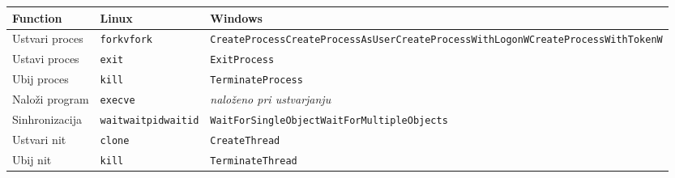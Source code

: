 \documentclass[a4paper,12pt,openright]{book}
\begin{document}
\begin{table}[h!]
	\begin{center}
		\begin{tabular}{ p{3.7cm}|p{2.5cm}|p{6cm} }
			Function          & Linux                                                  & Windows                                                                                                                                                                         \\
			\hline
			Ustvari proces    & \verb|fork|\newline\verb|vfork|                        & \verb|CreateProcess|\newline\verb|CreateProcessAsUser|\newline\verb|CreateProcessWithLogonW|\newline\verb|CreateProcessWithTokenW|                                              \\
			Ustavi proces     & \verb|exit|                                            & \verb|ExitProcess|                                                                                                                                                              \\
			Ubij proces       & \verb|kill|                                            & \verb|TerminateProcess|                                                                                                                                                         \\
			Naloži program   & \verb|execve|                                          & \textit{naloženo pri ustvarjanju}                                                                                                                                              \\
			Sinhronizacija    & \verb|wait|\newline\verb|waitpid|\newline\verb|waitid| & \verb|WaitForSingleObject|\newline\verb|WaitForMultipleObjects|                                                                                                                 \\
			Ustvari nit       & \verb|clone|                                           & \verb|CreateThread|                                                                                                                                                             \\
			Ubij nit          & \verb|kill|                                            & \verb|TerminateThread|                                                                                                                                                          \\

\end{tabular}
\end{center}
\end{table}
\end{document}
